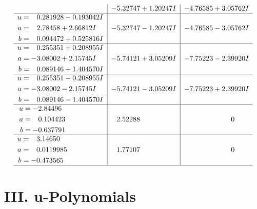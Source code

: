\documentclass[1p]{elsarticle_modified}
\theoremstyle{definition}
\begin{document}
$$\begin{array}{c|c|c}
 & -5.32747 + 1.20247 I & -4.76585 + 3.05762 I \\ \hline\begin{aligned}
u &= \phantom{-}0.281928 - 0.193042 I \\
a &= \phantom{-}2.78458 + 2.66812 I \\
b &= \phantom{-}0.094472 + 0.525816 I\end{aligned}
 & -5.32747 - 1.20247 I & -4.76585 - 3.05762 I \\ \hline\begin{aligned}
u &= \phantom{-}0.255351 + 0.208955 I \\
a &= -3.08002 + 2.15745 I \\
b &= \phantom{-}0.089146 + 1.404570 I\end{aligned}
 & -5.74121 + 3.05209 I & -7.75223 - 2.39920 I \\ \hline\begin{aligned}
u &= \phantom{-}0.255351 - 0.208955 I \\
a &= -3.08002 - 2.15745 I \\
b &= \phantom{-}0.089146 - 1.404570 I\end{aligned}
 & -5.74121 - 3.05209 I & -7.75223 + 2.39920 I \\ \hline\begin{aligned}
u &= -2.84496\phantom{ +0.000000I} \\
a &= \phantom{-}0.104423\phantom{ +0.000000I} \\
b &= -0.637791\phantom{ +0.000000I}\end{aligned}
 & \phantom{-}2.52288\phantom{ +0.000000I} & \phantom{-0.000000 } 0 \\ \hline\begin{aligned}
u &= \phantom{-}3.14650\phantom{ +0.000000I} \\
a &= \phantom{-}0.0119985\phantom{ +0.000000I} \\
b &= -0.473565\phantom{ +0.000000I}\end{aligned}
 & \phantom{-}1.77107\phantom{ +0.000000I} & \phantom{-0.000000 } 0\\
 \hline 
 \end{array}$$\newpage
\newpage\renewcommand{\arraystretch}{1}
\centering \section*{ III. u-Polynomials}
\end{document}
